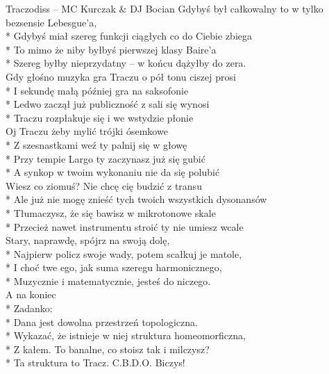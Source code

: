 \begin{piosenka_dluga}{Traczodiss -- MC Kurczak $\&$ DJ Bocian}
Gdybyś był całkowalny to w tylko bezsensie Lebesgue’a, \\*
Gdybyś miał szereg funkcji ciągłych co do Ciebie zbiega \\*
To mimo że niby byłbyś pierwszej klasy Baire’a \\*
Szereg byłby nieprzydatny -- w końcu dążyłby do zera. \\[\zwrotkaspace]

Gdy głośno muzyka gra Traczu o pół tonu ciszej prosi \\*
I sekundę małą później gra na saksofonie \\*
Ledwo zaczął już publiczność z sali się wynosi \\*
Traczu rozpłakuje się i we wstydzie płonie \\[\zwrotkaspace]

Oj Traczu żeby mylić trójki ósemkowe \\*
Z szesnastkami weź ty palnij się w głowę \\*
Przy tempie Largo ty zaczynasz już się gubić \\*
A synkop w twoim wykonaniu nie da się polubić \\[\zwrotkaspace]

Wiesz co ziomuś? Nie chcę cię budzić z transu \\*
Ale już nie mogę znieść tych twoich wszystkich dysonansów \\*
Tłumaczysz, że się bawisz w mikrotonowe skale \\*
Przecież nawet instrumentu stroić ty nie umiesz wcale \\[\zwrotkaspace]

Stary, naprawdę, spójrz na swoją dolę, \\*
Najpierw policz swoje wady, potem scałkuj je matole, \\*
I choć twe ego, jak suma szeregu harmonicznego, \\*
Muzycznie i matematycznie, jesteś do niczego. \\[\zwrotkaspace]

A na koniec \\*
Zadanko: \\*
Dana jest dowolna przestrzeń topologiczna. \\*
Wykazać, że istnieje w niej struktura homeomorficzna, \\*
Z kałem. To banalne, co stoisz tak i milczysz? \\*
Ta struktura to Tracz. C.B.D.O. Biczys! \\

\end{piosenka_dluga}
